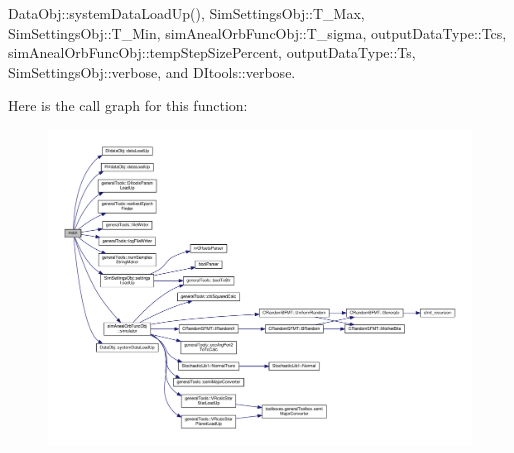 Data\-Obj\-::system\-Data\-Load\-Up(), Sim\-Settings\-Obj\-::\-T\-\_\-\-Max, Sim\-Settings\-Obj\-::\-T\-\_\-\-Min, sim\-Aneal\-Orb\-Func\-Obj\-::\-T\-\_\-sigma, output\-Data\-Type\-::\-Tcs, sim\-Aneal\-Orb\-Func\-Obj\-::temp\-Step\-Size\-Percent, output\-Data\-Type\-::\-Ts, Sim\-Settings\-Obj\-::verbose, and D\-Itools\-::verbose.



Here is the call graph for this function\-:
\nopagebreak
\begin{figure}[H]
\begin{center}
\leavevmode
\includegraphics[width=350pt]{sim_anneal_orb_simulator_8cpp_a0ddf1224851353fc92bfbff6f499fa97_cgraph}
\end{center}
\end{figure}


